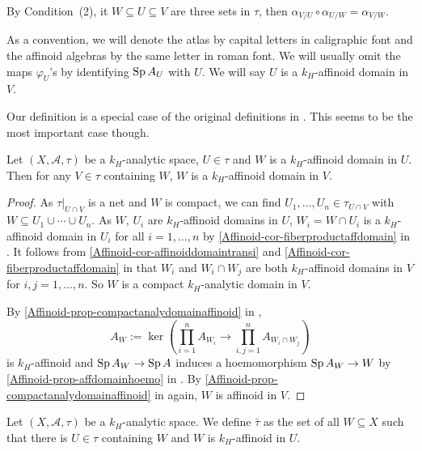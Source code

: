 By Condition~(2), it $W\subseteq U\subseteq V$ are three sets in $\tau$, then $\alpha_{V/U}\circ\alpha_{U/W}=\alpha_{V/W}$.

\begin{remark}\label{rmk-affdomainident}
    As a convention, we will denote the atlas by capital  letters in caligraphic font and the affinoid algebras by the same letter in roman font. We will usually omit the maps $\varphi_U$'s by identifying $\operatorname{Sp} A_U$ with $U$. We will say $U$ is a $k_H$-affinoid domain in $V$.    
\end{remark}


\begin{remark}
    Our definition is a special case of the original definitions in \cite{Berk93}. This seems to be the most important case though.
\end{remark}

\begin{lemma}\label{lma-innetaffinoneaffinall}
    Let $(X,\mathcal{A},\tau)$ be a $k_H$-analytic space, $U\in \tau$ and $W$ is a $k_H$-affinoid domain in $U$. Then for any $V\in \tau$ containing $W$, $W$ is a $k_H$-affinoid domain in $V$.
\end{lemma}
\begin{proof}
    As $\tau|_{U\cap V}$ is a net and $W$ is compact, we can find $U_1,\ldots,U_n\in \tau_{U\cap V}$ with $W\subseteq U_1\cup \cdots\cup  U_n$. As $W$, $U_i$ are $k_H$-affinoid domains in $U$, $W_i=W\cap U_i$ is a $k_H$-affinoid domain in $U_i$ for all $i=1,\ldots,n$ by \cref{Affinoid-cor-fiberproductaffdomain} in . It follows from \cref{Affinoid-cor-affinoiddomaintransi} and \cref{Affinoid-cor-fiberproductaffdomain} in  that $W_i$ and $W_i\cap W_j$ are both $k_H$-affinoid domains in $V$ for $i,j=1,\ldots,n$. So $W$ is a compact $k_H$-analytic domain in $V$.

    By \cref{Affinoid-prop-compactanalydomainaffinoid} in ,
    \[
        A_W:=\ker  \left( \prod_{i=1}^n A_{W_i} \rightarrow \prod_{i,j=1}^n A_{W_i\cap W_j}\right)
    \]
    is $k_H$-affinoid and $\operatorname{Sp} A_W\rightarrow \operatorname{Sp} A$ induces a hoemomorphism $\operatorname{Sp} A_W\rightarrow W$ by \cref{Affinoid-prop-affdomainhoemo} in . By \cref{Affinoid-prop-compactanalydomainaffinoid} in  again, $W$ is affinoid in $V$. 
\end{proof}

\begin{definition}
    Let $(X,\mathcal{A},\tau)$ be a $k_H$-analytic space. We define $\bar{\tau}$ as the set of all $W\subseteq X$ such that there is $U\in \tau$ containing $W$ and $W$ is $k_H$-affinoid in $U$.
\end{definition}

